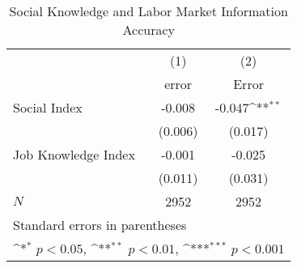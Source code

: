 \begin{table}[htbp]\centering
\def\sym#1{\ifmmode^{#1}\else\(^{#1}\)\fi}
\caption{Social Knowledge and Labor Market Information Accuracy}
\begin{tabular}{l*{2}{c}}
\hline\hline
            &\multicolumn{1}{c}{(1)}         &\multicolumn{1}{c}{(2)}         \\
            &       error         &       Error         \\
\hline
Social Index&      -0.008         &      -0.047\sym{**} \\
            &     (0.006)         &     (0.017)         \\
Job Knowledge Index&      -0.001         &      -0.025         \\
            &     (0.011)         &     (0.031)         \\
\hline
\(N\)       &        2952         &        2952         \\
\hline\hline
\multicolumn{3}{l}{\footnotesize Standard errors in parentheses}\\
\multicolumn{3}{l}{\footnotesize \sym{*} \(p<0.05\), \sym{**} \(p<0.01\), \sym{***} \(p<0.001\)}\\
\end{tabular}
\end{table}
